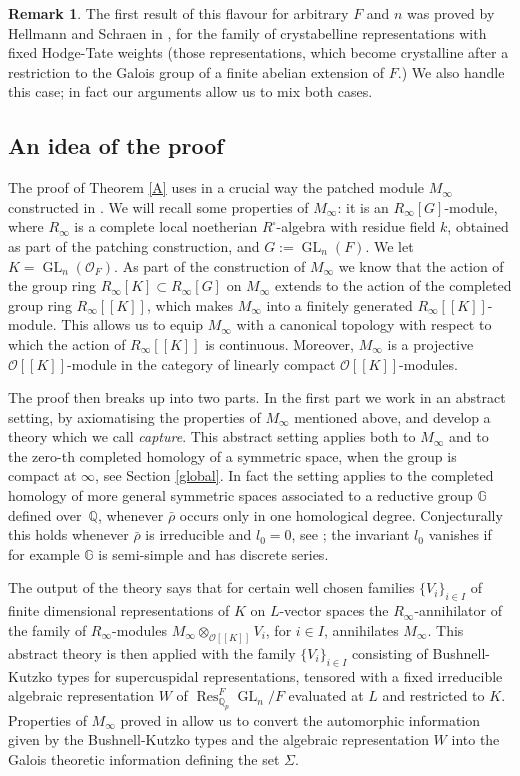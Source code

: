 \documentclass[JEP,XML,SOM,Unicode,NoEqCountersInSection]{cedram}
\let\mathcal\mathscr
\newcommand{\ssquare}{{\scriptscriptstyle\square}}
\theoremstyle{definition}
\newtheorem{remark}[prop]{Remark}
\DeclareMathOperator{\Res}{Res}
\DeclareMathOperator{\GL}{GL}
\newcommand{\br}[1]{[\![#1]\!]}
\newcommand{\Qp}{\mathbb {Q}_p}
\newcommand{\QQ}{\mathbb Q}
\newcommand{\cO}{\mathcal{O}}
\newcommand{\rhobar}{\bar{\rho}}
\begin{document}
\begin{remark}\label{rem_HS} The first result of this flavour for arbitrary $F$ and $n$ was proved by Hellmann
and Schraen in \cite{HS}, for the family of crystabelline representations with fixed Hodge-Tate
weights (\ie those representations, which become crystalline after a restriction to the Galois group of a finite abelian extension of $F$.) We also handle this case; in fact our arguments
allow us to mix both cases.
\end{remark}

\subsection{An idea of the proof} The proof of Theorem \ref{A} uses in a crucial way the
patched module $M_{\infty}$ constructed in \cite{six-authors}. We will recall some properties of $M_{\infty}$: it is an $R_{\infty}[G]$-module,
where $R_{\infty}$ is a complete local noetherian $R^\ssquare$-algebra with residue field $k$, obtained
as part of the patching construction, and $G:=\GL_n(F)$. We let $K=\GL_n(\cO_F)$. As part of the construction of $M_\infty$ we know that the action of the group ring $R_{\infty}[K]\subset
R_{\infty}[G]$ on $M_{\infty}$ extends to the action of the completed group ring $R_{\infty}\br{K}$,
which makes $M_{\infty}$ into a finitely generated $R_{\infty}\br{K}$-module.
This allows us to equip $M_{\infty}$ with a canonical topology with respect to which the action
of $R_{\infty}\br{K}$ is continuous. Moreover, $M_{\infty}$ is
a projective $\cO\br{K}$-module in the category of linearly compact $\cO\br{K}$-modules.

The proof then breaks up into two parts. In the first part we work in an abstract setting,
by axiomatising the properties of $M_\infty$ mentioned above, and develop a theory which we call \textit{capture}. This abstract setting applies both to $M_{\infty}$ and to the zero-th completed homology of a symmetric space, when the group is compact at $\infty$, see Section \ref{global}. In fact the setting applies to the completed homology
of more general symmetric spaces associated to a reductive group $\mathbb G$ defined over~$\QQ$, whenever $\rhobar$ occurs only in one homological degree. Conjecturally this holds whenever
$\rhobar$ is irreducible and $l_0=0$, see \cite[Conj.\,3.3]{matt_icm}; the invariant $l_0$ vanishes if for example $\mathbb G$ is semi-simple and has discrete series.

The output of the theory says that for certain well chosen families $\{ V_i\}_{i\in I}$ of finite dimensional representations of $K$ on $L$-vector spaces the $R_{\infty}$-annihilator
of the family of $R_{\infty}$-modules $M_{\infty}\otimes_{\cO\br{K}} V_i$, for $i\in I$,
annihilates $M_{\infty}$. This abstract theory is then applied with the family $\{V_i\}_{i\in I}$ consisting of
Bushnell-Kutzko types for supercuspidal representations, tensored with a fixed irreducible
algebraic representation $W$ of $\Res^F_{\Qp} \GL_n/F$ evaluated at $L$ and restricted to $K$. Properties of $M_{\infty}$ proved in \cite{six-authors} allow us to convert the automorphic
information given by the Bushnell-Kutzko types and the algebraic representation $W$ into the Galois
theoretic information defining the set $\Sigma$.
\end{document}

